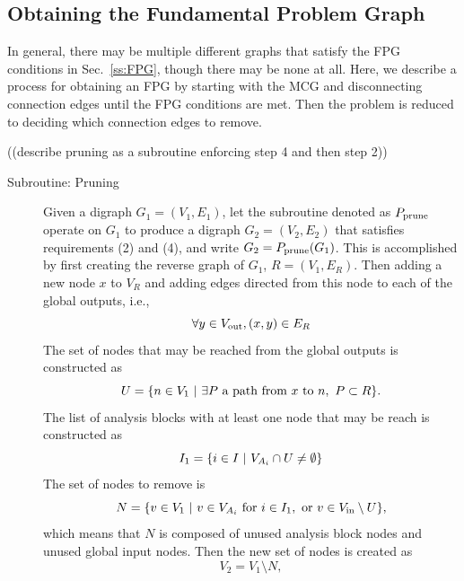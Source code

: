 \subsection{Obtaining the Fundamental Problem Graph}
    \label{ss:obtaining FPG}
    In general, there may be multiple different graphs that satisfy the FPG conditions in Sec.~\ref{ss:FPG}, though there may be none at all. 
    Here, we describe a process for obtaining an FPG by starting with the MCG and disconnecting connection edges until the FPG conditions are met. 
    Then the problem is reduced to deciding which connection edges to remove.

((describe pruning as a subroutine enforcing step 4 and then step 2))

    \begin{description}
    \item[Subroutine: Pruning] 
        Given a digraph $G_1 = (V_1,E_1)$, let the subroutine denoted as $P_\textrm{prune}$ operate on $G_1$ to produce a digraph $G_2 = (V_2,E_2)$ that satisfies requirements (2) 
        and (4), and write $G_2 = P_\textrm{prune} ( G_1 )$. 
        This is accomplished by first creating the reverse graph of $G_1$, $R = (V_1,E_R)$. Then adding a new node $x$ to $V_R$ and adding edges directed from this node to each of the global outputs, i.e.,
    \begin{equation}
        \forall y \in V_\textrm{out}, (x,y) \in E_R
    \end{equation}
        The set of nodes that may be reached from the global outputs is constructed as
    \begin{equation}
        U = \{ n \in V_1 \ | \  \exists P \textrm{ a path from $x$ to $n$}, \ P \subset R \}.
        \end{equation}
        The list of analysis blocks with at least one node that may be reach is constructed as
        \begin{equation}
        I_1 = \{ i \in I \ | \  V_{A_i} \cap U \neq \emptyset \}
        \end{equation}
        The set of nodes to remove is
        \begin{equation}
        N = \{ v \in V_1 \ | \  v \in V_{A_i} \textrm{ for } i \in I_1, \textrm{ or } v \in V_\textrm{in}\setminus U \},
        \end{equation}
        which means that $N$ is composed of unused analysis block nodes and unused global input nodes. Then the new set of nodes is created as
        \begin{equation}
        V_2 = V_1 \setminus N,

\end{equation}
\end{description}
